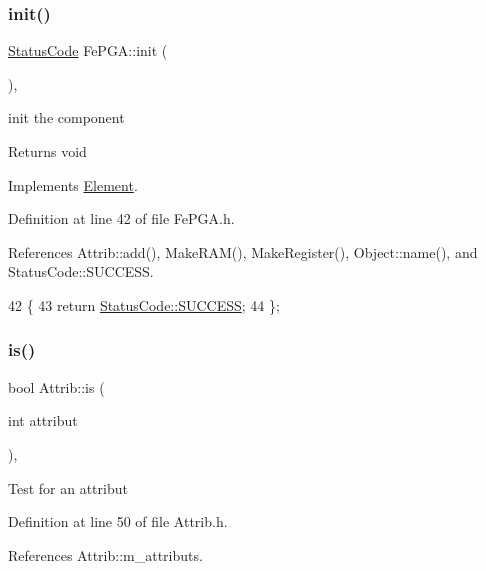\subsubsection{\texorpdfstring{init()}{init()}}
{\footnotesize\ttfamily \hyperlink{classStatusCode}{Status\+Code} Fe\+P\+G\+A\+::init (\begin{DoxyParamCaption}{ }\end{DoxyParamCaption})\hspace{0.3cm}{\ttfamily [inline]}, {\ttfamily [virtual]}}

init the component

\begin{DoxyReturn}{Returns}
void 
\end{DoxyReturn}


Implements \hyperlink{classElement_af42754b5cabc198869222725218d695c}{Element}.



Definition at line 42 of file Fe\+P\+G\+A.\+h.



References Attrib\+::add(), Make\+R\+A\+M(), Make\+Register(), Object\+::name(), and Status\+Code\+::\+S\+U\+C\+C\+E\+SS.


\begin{DoxyCode}
42                     \{
43     \textcolor{keywordflow}{return} \hyperlink{classStatusCode_a6f565cbeadc76d14c72f047e5e85eb4badd0da38d3ba0d922efd1f4619bc37ad8}{StatusCode::SUCCESS};
44   \};
\end{DoxyCode}
\mbox{\label{classAttrib_a704f26af560909ad22065083bb7d4c34}} 
\subsubsection{\texorpdfstring{is()}{is()}}
{\footnotesize\ttfamily bool Attrib\+::is (\begin{DoxyParamCaption}\item[{int}]{attribut }\end{DoxyParamCaption})\hspace{0.3cm}{\ttfamily [inline]}, {\ttfamily [inherited]}}

Test for an attribut 

Definition at line 50 of file Attrib.\+h.



References Attrib\+::m\+\_\+attributs.



